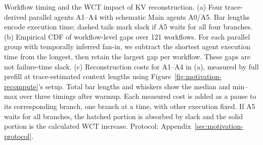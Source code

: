 \caption{Workflow timing and the WCT impact of KV reconstruction.
    (a) Four trace-derived parallel agents A1--A4 with schematic Main
    agents A0/A5. Bar lengths encode execution time; dashed tails mark
    slack if A5 waits for all four branches.
    (b) Empirical CDF of workflow-level gaps over 121 workflows.
    For each parallel group with temporally inferred fan-in, we subtract
    the shortest agent execution time from the longest, then retain the
    largest gap per workflow. These gaps are not failure-time slack.
    (c) Reconstruction costs for A1--A4 in (a), measured by full prefill
    at trace-estimated context lengths using
    Figure~\ref{fig:motivation-recompute}'s setup. Total bar lengths and
    whiskers show the median and min--max over three timings after warmup.
    Each measured cost is added as a pause to its corresponding branch,
    one branch at a time, with other execution fixed. If A5 waits for all
    branches, the hatched portion is absorbed by slack and the solid
    portion is the calculated WCT increase.
    Protocol: Appendix~\ref{sec:motivation-protocol}.}
